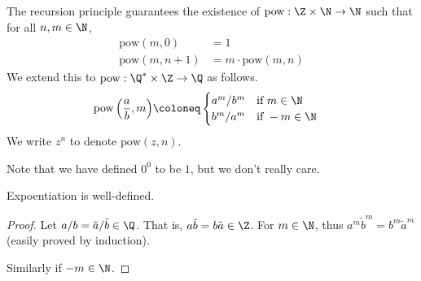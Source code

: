 \begin{definition}[Exponentiation] \label{def:exponentiation}
    The recursion principle guarantees the existence of
    $\mathrm{pow} : \Z \times \N \to \N$ such that for all $n, m \in \N$,
    \begin{align*}
        \mathrm{pow}(m, 0) &= 1 \\
        \mathrm{pow}(m, n + 1) &= m \cdot \mathrm{pow}(m, n)
    \end{align*}
    We extend this to $\mathrm{pow} : \Q^* \times \Z \to \Q$ as follows.
    \begin{align*}
        \mathrm{pow}\left(\frac{a}{b}, m\right) &\coloneq \begin{cases}
            a^m / b^m & \text{if } m \in \N \\
            b^m / a^m & \text{if } -m \in \N \\
        \end{cases}
    \end{align*}
    We write $z^n$ to denote $\mathrm{pow}(z, n)$.
\end{definition}
\begin{remark}
    Note that we have defined $0^0$ to be $1$, but we don't really care.
\end{remark}
\begin{proposition}
    Expoentiation is well-defined.
\end{proposition}
\begin{proof}
    Let $a/b = \tilde{a}/\tilde{b} \in \Q$.
    That is, $a\tilde{b} = b\tilde{a} \in \Z$.
    For $m \in \N$, thus $a^m \tilde{b}^m = b^m \tilde{a}^m$ (easily proved by
    induction).

    Similarly if $-m \in \N$.
\end{proof}

